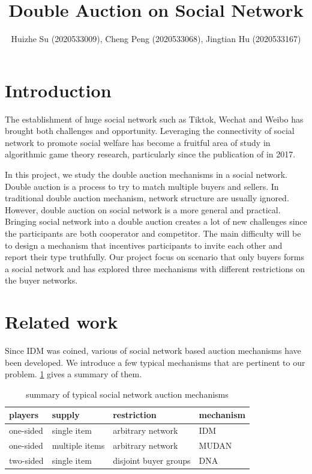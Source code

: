\documentclass[format=acmsmall, review=false, natbib=false]{acmart}
\title{Double Auction on Social Network}
\author{Huizhe Su (2020533009), Cheng Peng (2020533068), Jingtian Hu (2020533167)}
\begin{document}

\maketitle


\section{Introduction}

The establishment of huge social network such as Tiktok, Wechat and Weibo has brought both challenges and opportunity.
Leveraging the connectivity of social network to promote social welfare has become a fruitful area of study in algorithmic game theory research, particularly since the publication of \cite{mechanism-design-in-social-network} in 2017.

In this project, we study the double auction mechanisms in a social network. Double auction is a process to try to match multiple buyers and sellers. In traditional double auction mechanism, network structure are usually ignored. However, double auction on social network is a more general and practical. Bringing social network into a double auction creates a lot of new challenges since the participants are both cooperator and competitor. The main difficulty will be to design a mechanism that incentives participants to invite each other and report their type truthfully. Our project focus on scenario that only buyers forms a social network and has explored three mechanisms with different restrictions on the buyer networks.


\section{Related work}

Since IDM\cite{IDM} was coined, various of social network based auction mechanisms have been developed.
We introduce a few typical mechanisms that are pertinent to our problem. \ref{tab:previous-works} gives a summary of them.

\begin{table}[H]
	\centering
	\begin{tabular}{ll|l|l}
		players   & supply         & restriction           & mechanism \\
		\hline
		one-sided & single item    & arbitrary network     & IDM       \\
		one-sided & multiple items & arbitrary network     & MUDAN     \\
		two-sided & single item    & disjoint buyer groups & DNA       \\
	\end{tabular}
	\caption{summary of typical social network auction mechanisms}
	\label{tab:previous-works}
\end{table}
\end{document}
